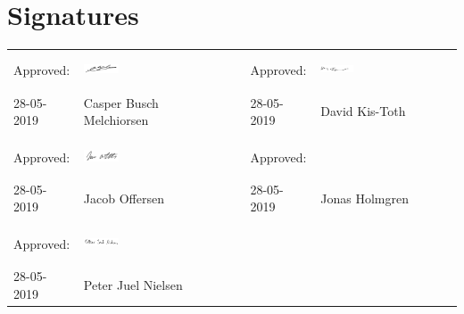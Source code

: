 \section*{Signatures}


\begin{table}[H]
\begin{tabular}{lllll}
Approved:  & \includegraphics[width=0.25\textwidth, height=10mm]{pictures/general/casper.PNG} &  & Approved:  & \includegraphics[width=0.25\textwidth, height=10mm]{pictures/general/david.PNG} \\ \cline{2-2} \cline{5-5} 
28-05-2019 & Casper Busch Melchiorsen &  & 28-05-2019 & David Kis-Toth \\
           &                          &  &            &                \\
Approved:  & \includegraphics[width=0.25\textwidth, height=10mm]{pictures/general/jacob.PNG} &  & Approved:  &                \\ \cline{2-2} \cline{5-5} 
28-05-2019 & Jacob Offersen           &  & 28-05-2019 & Jonas Holmgren \\
           &                          &  &            &                \\
Approved:  & \includegraphics[width=0.25\textwidth, height=10mm]{pictures/general/peter.PNG}&  &            &                \\ \cline{2-2}
28-05-2019 & Peter Juel Nielsen       &  &            &               
\end{tabular}
\end{table}